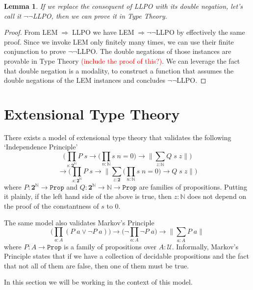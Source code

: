 \documentclass[12pt]{article}
\newcommand\todo[1]{\textcolor{red}{#1}}
\newtheorem{lem}[thm]{Lemma}
\begin{document}
\begin{lem}\label{llponeg}
If we replace the consequent of LLPO with its double negation, let's call it $\neg\neg$LLPO, then we can prove it in Type Theory. 
\end{lem}
\begin{proof}
From LEM$\;\Rightarrow\;$LLPO we have LEM$\;\Rightarrow\neg\neg$LLPO by effectively the same proof. 
Since we invoke LEM only finitely many times, we can use their finite conjunction to prove $\neg\neg$LLPO. 
The double negations of those instances are provable in Type Theory \todo{(include the proof of this?)}.
We can leverage the fact that double negation is a modality, to construct a function that assumes the double negations of the LEM instances and concludes $\neg\neg$LLPO.
\end{proof}

\section{Extensional Type Theory}
There exists a model of extensional type theory that validates the following `Independence Principle'
$$\bigg( \prod_{s : \mathbf{2}^\mathbb{N}} P\; s \rightarrow \Big(\prod_{n : \mathbb{N}}s\; n = 0 \Big) \rightarrow \Big\lVert \sum_{z : \mathbb{N}} Q\; s\; z \Big\rVert \bigg)$$
$$\rightarrow \bigg( \prod_{s : \mathbf{2}^\mathbb{N}} P\; s \rightarrow  \Big\lVert \sum_{z : \mathbf{2}} \Big(\prod_{n : \mathbb{N}}s\; n = 0 \Big) \rightarrow Q \; s\; z\Big\rVert \bigg)$$
where $P: \mathbf{2}^\mathbb{N} \rightarrow \mathtt{Prop}$ and $Q : \mathbf{2}^\mathbb{N} \rightarrow \mathbb{N} \rightarrow \mathtt{Prop} $ are families of propositions. 
Putting it plainly, if the left hand side of the above is true, then $z : \mathbb{N}$ does not depend on the proof of the constantness of $s$ to $0$.

The same model also validates Markov's Principle
$$\Big(\prod_{a : A}(P\; a \vee \neg P\; a)\Big) \rightarrow  \Big(\neg \prod_{a : A}\neg P\; a\Big)\rightarrow \Big\lVert \sum_{a : A} P\; a \Big\rVert$$
where $P : A \rightarrow \mathtt{Prop}$ is a family of propositions over $A : \mathcal{U}$. 
Informally, Markov's Principle states that if we have a collection of decidable propositions and the fact that not all of them are false, then one of them must be true.

In this section we will be working in the context of this model.
\end{document}
